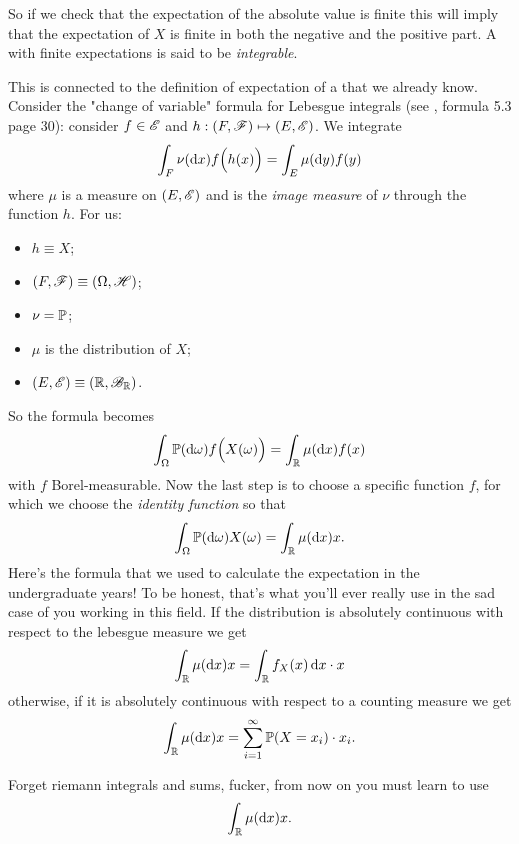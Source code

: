 \documentclass{report}
\begin{document}
So if we check that the expectation of the absolute value is finite this will imply that the expectation of $X$ is finite in both the negative and the positive part. A \rv{} with finite expectations is said to be \emph{integrable}.
\begin{remark}\label{eh}
	This is connected to the definition of expectation of a \rv{} that we already know. Consider the "change of variable" formula for Lebesgue integrals (see \cinlar, formula 5.3 page 30): consider $f\in\mathscr{E}$ and $h:(F,\mathscr{F})\mapsto(E,\mathscr{E})$. We integrate
	\[\int_F\nu(\mathop{}\!\mathrm{d} x)f\Big(h(x)\Big)=\int_E\mu(\mathop{}\!\mathrm{d} y)f(y)\]
	where $\mu$ is a measure on $(E,\mathscr{E})$ and is the \textit{image measure} of $\nu$ through the function $h$. For us:
	\begin{itemize}
		\item $h\equiv X$;
		\item $(F,\mathscr{F})\equiv(\Omega,\mathscr{H})$;
		\item $\nu=\mathbb{P}$;
		\item $\mu$ is the distribution of $X$;
		\item $(E,\mathscr{E})\equiv(\mathbb{R},\mathscr{B}_{\mathbb{R}})$.
	\end{itemize}
	So the formula becomes
	\[\int_\Omega\mathbb{P}(\mathop{}\!\mathrm{d}\omega)f\Big(X(\omega)\Big)=\int_{\mathbb{R}}\mu(\mathop{}\!\mathrm{d} x)f(x)\]
	with $f$ Borel-measurable. Now the last step is to choose a specific function $f$, for which we choose the \textit{identity function} so that
	\[\int_\Omega\mathbb{P}(\mathop{}\!\mathrm{d}\omega)X(\omega)=\int_{\mathbb{R}}\mu(\mathop{}\!\mathrm{d} x)x.\]
	Here's the formula that we used to calculate the expectation in the undergraduate years! To be honest, that's what you'll ever really use in the sad case of you working in this field. If the distribution is absolutely continuous with respect to the lebesgue measure we get
	\[\int_{\mathbb{R}}\mu(\mathop{}\!\mathrm{d} x)x=\int_{\mathbb{R}}f_X(x)\mathop{}\!\mathrm{d} x\cdot x\]
	otherwise, if it is absolutely continuous with respect to a counting measure we get
	\[\int_{\mathbb{R}}\mu(\mathop{}\!\mathrm{d} x)x=\sum_{i=1}^{\infty}\mathbb{P}(X=x_i)\cdot x_i.\]
	\begin{notation}
		Forget riemann integrals and sums, fucker, from now on you must learn to use 
		\[\int_{\mathbb{R}}\mu(\mathop{}\!\mathrm{d} x)x.\]
	\end{notation}
\end{remark}
\end{document}
